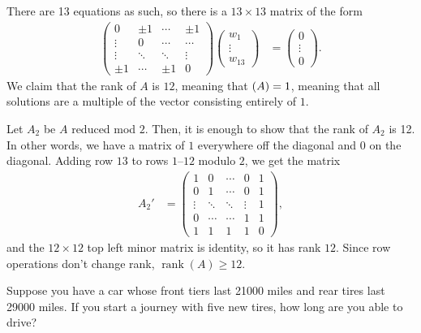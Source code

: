 \documentclass[10pt]{mypackage}
\begin{document}
\begin{solution}
\begin{enumerate}[(a)]
      There are 13 equations as such, so there is a $13\times 13$ matrix of the form
      \begin{align*}
        \begin{pmatrix}0 & \pm 1 & \cdots & \pm 1\\\vdots & 0 & \cdots & \cdots \\ \vdots & \ddots & \ddots & \vdots \\ \pm 1 & \cdots & \pm 1 & 0\end{pmatrix} \begin{pmatrix}w_1\\\vdots\\w_{13}\end{pmatrix} &= \begin{pmatrix}0\\\vdots\\0\end{pmatrix}.
      \end{align*}
      We claim that the rank of $A$ is $12$, meaning that $\null(A) = 1$, meaning that all solutions are a multiple of the vector consisting entirely of $1$.\newline

      Let $A_2$ be $A$ reduced mod $2$. Then, it is enough to show that the rank of $A_2$ is 12. In other words, we have a matrix of $1$ everywhere off the diagonal and $0$ on the diagonal. Adding row $13$ to rows $1$--$12$ modulo $2$, we get the matrix
      \begin{align*}
        A_2' &=  \begin{pmatrix}
1 & 0 & \cdots & 0 & 1 \\
0 & 1 & \cdots & 0 & 1 \\
\vdots & \ddots & \ddots & \vdots & 1 \\
0 & \cdots & \cdots & 1 & 1 \\
1 & 1 & 1 & 1 & 0 
\end{pmatrix}  ,
      \end{align*}
      and the $12\times 12$ top left minor matrix is identity, so it has rank $12$. Since row operations don't change rank, $\operatorname{rank}\left( A \right) \geq 12$.
  \end{enumerate}
\end{solution}
\begin{problem}
  Suppose you have a car whose front tiers last 21000 miles and rear tires last 29000 miles. If you start a journey with five new tires, how long are you able to drive?
\end{problem}
\end{document}
